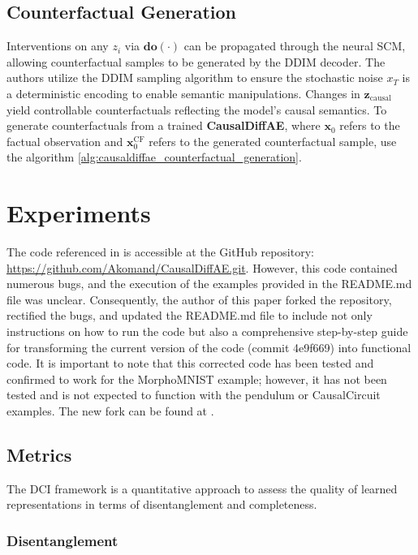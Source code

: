 \documentclass{article}
\newcommand{\x}{\mathbf{x}}
\newcommand{\zc}{\textbf{z}_\text{causal}}
\begin{document}
	\subsection*{Counterfactual Generation}
	
	Interventions on any $z_i$ via $\boldsymbol{do}(\cdot)$ can be propagated through the neural SCM, allowing counterfactual samples to be generated by the DDIM decoder. The authors utilize the DDIM sampling algorithm to ensure the stochastic noise $x_T$ is a deterministic encoding to enable semantic manipulations. Changes in $\zc$ yield controllable counterfactuals reflecting the model's causal semantics. To generate counterfactuals from a trained \textbf{CausalDiffAE}, where $\x_0$ refers to the factual observation and $\x_0^{\text{CF}}$ refers to the generated counterfactual sample, use the algorithm \autoref{alg:causaldiffae_counterfactual_generation}.
	
	\section{Experiments}
	
	The code referenced in \cite{akomandu2024} is accessible at the GitHub repository: \url{https://github.com/Akomand/CausalDiffAE.git}. However, this code contained numerous bugs, and the execution of the examples provided in the README.md file was unclear. Consequently, the author of this paper forked the repository, rectified the bugs, and updated the README.md file to include not only instructions on how to run the code but also a comprehensive step-by-step guide for transforming the current version of the code (commit 4e9f669) into functional code. It is important to note that this corrected code has been tested and confirmed to work for the MorphoMNIST example; however, it has not been tested and is not expected to function with the pendulum or CausalCircuit examples. The new fork can be found at \cite{causaldiffae_fzj}.
	
	\subsection{Metrics}
	
	The DCI framework is a quantitative approach to assess the quality of learned representations in terms of disentanglement and completeness.
	
	\subsubsection*{Disentanglement}
	
\end{document}
